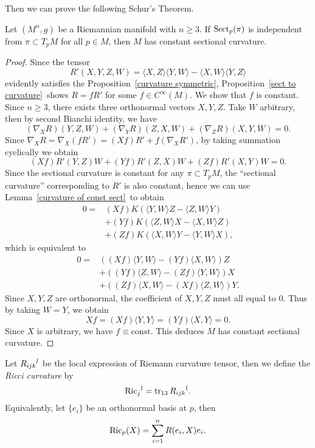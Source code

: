 Then we can prove the following Schur's Theorem.
\begin{thm}[Schur]
    Let $(M^n,g)$ be a Riemannian manifold with $n\geq 3$.
    If $\Sect_p(\pi)$ is independent from $\pi\subset T_pM$ for all $p\in M$, then $M$ has constant sectional curvature.
\end{thm}
\begin{proof}
    Since the tensor
    \[R'(X,Y,Z,W)=\langle X,Z\rangle\langle Y,W\rangle-\langle X,W\rangle\langle Y,Z\rangle\]
    evidently satisfies the Proposition~\ref{curvature symmetric}, Proposition~\ref{sect to curvature}~shows $R=fR'$ for some $f\in C^\infty(M)$.
    We show that $f$ is constant.
    Since $n\geq 3$, there exists three orthonormal vectors $X,Y,Z$.
    Take $W$ arbitrary, then by second Bianchi identity, we have
    \[(\nabla_XR)(Y,Z,W)+(\nabla_YR)(Z,X,W)+(\nabla_ZR)(X,Y,W)=0.\]
    Since $\nabla_XR=\nabla_X(fR')=(Xf)R'+f(\nabla_XR')$, by taking summation cyclically we obtain
    \[(Xf)R'(Y,Z)W+(Yf)R'(Z,X)W+(Zf)R'(X,Y)W=0.\]
    Since the sectional curvature is constant for any $\pi\subset T_pM$, the ``sectional curvature'' corresponding to $R'$ is also constant, hence we can use Lemma~\ref{curvature of const sect}~to obtain
    \begin{align*}
        0=&(Xf)K(\langle Y,W\rangle Z-\langle Z,W\rangle Y)\\
        &+(Yf)K(\langle Z,W\rangle X-\langle X,W\rangle Z)\\
        &+(Zf)K(\langle X,W\rangle Y-\langle Y,W\rangle X),
    \end{align*}
    which is equivalent to
    \begin{align*}
        0=&((Xf)\langle Y,W\rangle-(Yf)\langle X,W\rangle)Z\\
        &+((Yf)\langle Z,W\rangle-(Zf)\langle Y,W\rangle)X\\
        &+((Zf)\langle X,W\rangle-(Xf)\langle Z,W\rangle)Y.
    \end{align*}
    Since $X,Y,Z$ are orthonormal, the coefficient of $X,Y,Z$ must all equal to $0$.
    Thus by taking $W=Y$, we obtain
    \[Xf=(Xf)\langle Y,Y\rangle=(Yf)\langle X,Y\rangle=0.\]
    Since $X$ is arbitrary, we have $f\equiv\text{const}$.
    This deduces $M$ has constant sectional curvature.
\end{proof}

\begin{defn}
    Let $\R{l}{i}{j}{k}$ be the local expression of Riemann curvature tensor, then we define the \emph{Ricci curvature} by
    \[\Ricij{l}{j}=\tr_{13}\R{l}{i}{j}{k}.\]
    Equivalently, let $\{e_i\}$ be an orthonormal basis at $p$, then
    \[\Ric_p(X)=\sum_{i=1}^nR(e_i,X)e_i.\]
\end{defn}

